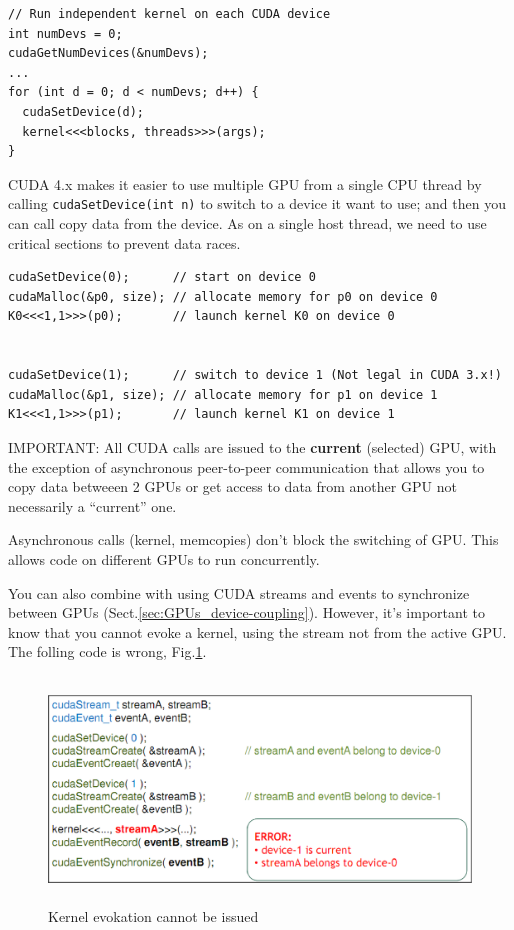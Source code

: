 \begin{lstlisting}
// Run independent kernel on each CUDA device
int numDevs = 0;
cudaGetNumDevices(&numDevs);
...
for (int d = 0; d < numDevs; d++) {
  cudaSetDevice(d);
  kernel<<<blocks, threads>>>(args);
}
\end{lstlisting}

CUDA 4.x makes it easier to use multiple GPU from a single CPU thread
by calling \verb!cudaSetDevice(int n)! to switch to a device it want
to use; and then you can call copy data from the device. As on a
single host thread, we need to use critical sections to prevent data
races.

\begin{lstlisting}
cudaSetDevice(0);      // start on device 0
cudaMalloc(&p0, size); // allocate memory for p0 on device 0
K0<<<1,1>>>(p0);       // launch kernel K0 on device 0


cudaSetDevice(1);      // switch to device 1 (Not legal in CUDA 3.x!)
cudaMalloc(&p1, size); // allocate memory for p1 on device 1
K1<<<1,1>>>(p1);       // launch kernel K1 on device 1
\end{lstlisting}

\begin{framed}
IMPORTANT: All CUDA calls are issued to the {\bf current} (selected) GPU, with
the exception of asynchronous peer-to-peer communication that allows you to
copy data betweeen 2 GPUs or get access to data from another GPU not necessarily
a ``current'' one.

Asynchronous calls (kernel, memcopies) don't block the switching of GPU. This
allows code on different GPUs to run concurrently.
\end{framed}

You can also combine with using CUDA streams and events to synchronize between
GPUs (Sect.\ref{sec:GPUs_device-coupling}). However, it's important to know that
you cannot evoke a kernel, using the stream not from the active GPU. The folling
code is wrong, Fig.\ref{fig:CUDA4_wrongstream}.

\begin{figure}[hbt]
  \centerline{\includegraphics[height=6cm,
    angle=0]{./images/CUDA4_ex_wrongstream.eps}}
  \caption{Kernel evokation cannot be issued}
  \label{fig:CUDA4_wrongstream}
\end{figure}



